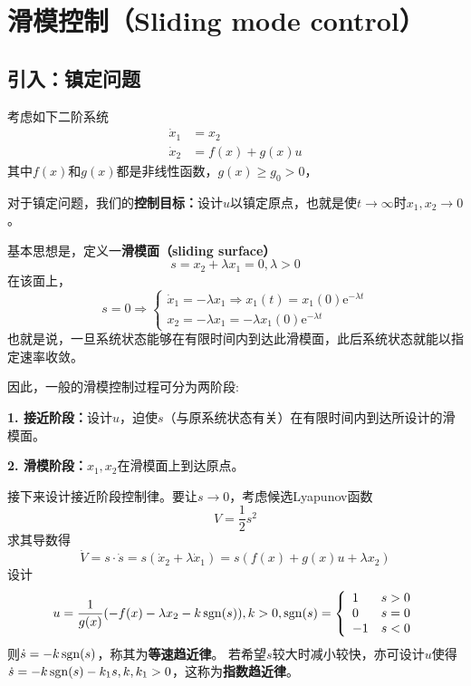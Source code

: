\newpage
\section{滑模控制（Sliding mode control）}\label{5Cref}

\subsection{引入：镇定问题}

 考虑如下二阶系统
 \begin{equation}
   \begin{aligned}
    \dot{x}_1 & = x_2\\
    \dot{x}_2 & = f (x) + g (x) u
    \end{aligned}\label{Sys:sliding_mode}
 \end{equation}
  其中$f (x)$和$g (x)$都是非线性函数，$g (x) \geq g_0 > 0$，
  
  对于镇定问题，我们的\textbf{控制目标：}设计$u$以镇定原点，也就是使$t
  \rightarrow \infty $时$ x_1, x_2 \rightarrow 0$。
  
  基本思想是，定义一\textbf{滑模面（sliding surface）}\[s = x_2 + \lambda x_1 = 0,
  \lambda > 0\]
  在该面上， \[ s = 0 \Rightarrow \left\{\begin{array}{l}
       \dot{x}_1 = - \lambda x_1 \Rightarrow x_1 (t) = x_1 (0) \mathrm{e}^{- \lambda t}\\
       x_2 = - \lambda x_1 = - \lambda x_1 (0) \mathrm{e}^{- \lambda  t}
     \end{array}\right. \]
     也就是说，一旦系统状态能够在有限时间内到达此滑模面，此后系统状态就能以指定速率收敛。
  
  因此，一般的滑模控制过程可分为两阶段:
  
  \textbf{1. 接近阶段：}设计$u$，迫使$s$（与原系统状态有关）在有限时间内到达所设计的滑模面。
  
  \textbf{2. 滑模阶段：}$x_1, x_2$在滑模面上到达原点。
  
  接下来设计接近阶段控制律。要让$s\to 0$，考虑候选Lyapunov函数\[V = \frac{1}{2} s^2\]
  求其导数得
  \[ \dot{V} = s \cdot \dot{s}=s(\dot{x}_2 + \lambda \dot{x}_1) = s (f (x) + g (x) u + \lambda x_2) \]
  设计\[u = \frac{1}{g (x)} (- f (x) - \lambda x_2 - k \operatorname{sgn} (s)),k > 0,\operatorname{sgn}(s) = \left\{\begin{array}{ll}
  1 & s > 0\\
  0 & s = 0\\
  - 1 & s < 0
\end{array}\right.\]
  则$\dot{s} = - k \operatorname{sgn} (s)$，称其为\textbf{等速趋近律}。
  若希望$s$较大时减小较快，亦可设计$u$使得$\dot{s}
  = - k \operatorname{sgn} (s) - k_1 s,k,k_1>0$，这称为\textbf{指数趋近律}。
  

